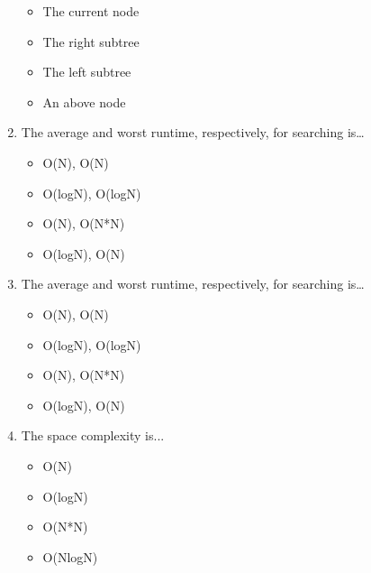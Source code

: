 \begin{enumerate}
\begin{itemize}
     \item The current node
     \item The right subtree
     \item The left subtree
     \item An above node
   \end{itemize}
   \item The average and worst runtime, respectively, for searching is…
  \begin{itemize}
     \item O(N), O(N)
     \item O(logN), O(logN)
     \item O(N), O(N*N)
     \item O(logN), O(N)
   \end{itemize}
   \item The average and worst runtime, respectively, for searching is…
  \begin{itemize}
     \item O(N), O(N)
     \item O(logN), O(logN)
     \item O(N), O(N*N)
     \item O(logN), O(N)
   \end{itemize}
   \item The space complexity is...
  \begin{itemize}
     \item O(N)
     \item O(logN)
     \item O(N*N)
     \item O(NlogN)
   \end{itemize}
\end{enumerate}

